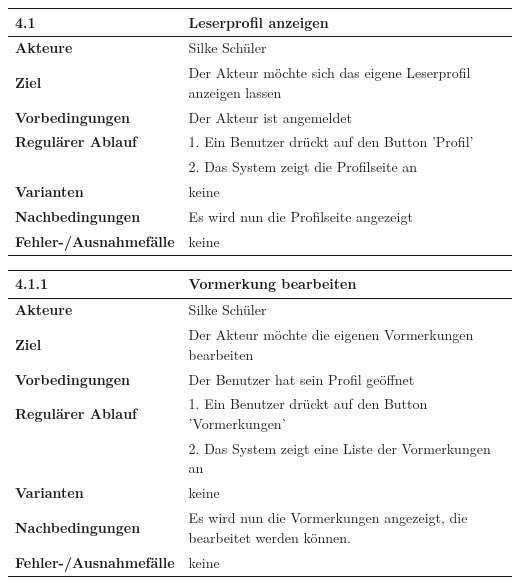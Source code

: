 \documentclass[fontsize=12pt,paper=a4,twoside]{scrartcl}
\begin{document}
\begin{table}[htbp]
\label{4.1}
\begin{tabular}{|l|p{10cm}|}
\hline 
\textbf{4.1} & \textbf{Leserprofil anzeigen} \\ \hline
\textbf{Akteure} & Silke Schüler\\ \hline
\textbf{Ziel} & Der Akteur möchte sich das eigene Leserprofil anzeigen lassen  \\ \hline
\textbf{Vorbedingungen} & Der Akteur ist angemeldet  \\ \hline
\textbf{Regulärer Ablauf} & 
1. Ein Benutzer drückt auf den Button 'Profil' \\
&2. Das System zeigt die Profilseite an\\
\hline
\textbf{Varianten} & 
keine \\ \hline
\textbf{Nachbedingungen} & Es wird nun die Profilseite angezeigt \\ \hline
\textbf{Fehler-/Ausnahmefälle} & keine\\
\hline
\end{tabular}
\end{table}

\begin{table}[htbp]
\label{4.1.1}
\begin{tabular}{|l|p{10cm}|}
\hline 
\textbf{4.1.1} & \textbf{Vormerkung bearbeiten} \\ \hline
\textbf{Akteure} & Silke Schüler\\ \hline
\textbf{Ziel} & Der Akteur möchte die eigenen Vormerkungen bearbeiten  \\ \hline
\textbf{Vorbedingungen} & Der Benutzer hat sein Profil geöffnet  \\ \hline
\textbf{Regulärer Ablauf} & 
1. Ein Benutzer drückt auf den Button 'Vormerkungen' \\
&2. Das System zeigt eine Liste der Vormerkungen an\\
\hline
\textbf{Varianten} & 
keine \\ \hline
\textbf{Nachbedingungen} & Es wird nun die Vormerkungen angezeigt, die bearbeitet werden können.\\ 
\hline
\textbf{Fehler-/Ausnahmefälle} & keine\\
\hline
\end{tabular}
\end{table}
\end{document}
